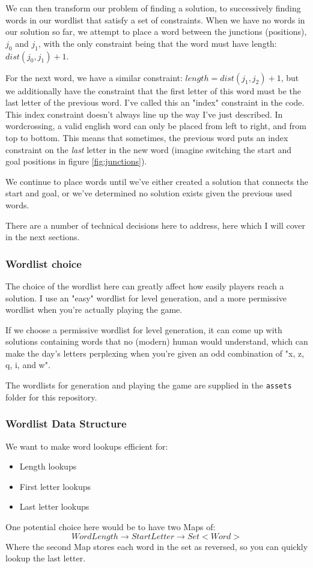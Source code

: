 \documentclass{article}
\begin{document}
We can then transform our problem of finding a solution, to successively finding
words in our wordlist that satisfy a set of constraints. 
When we have no words in our solution so far, we attempt 
to place a word between the junctions (positions), $j_0$ and $j_1$, with the
only constraint being that the word must have length: $dist(j_0, j_1) + 1$.

For the next word, we have a similar constraint: $length = dist(j_1, j_2) + 1$, 
but we additionally have the constraint that the first letter of this word must 
be the last letter of the previous word. I've called this an "index" constraint in the 
code. This index constraint doesn't always line up the way I've just described.
In wordcrossing, a valid english word can only be placed from left to right,
and from top to bottom. This means that sometimes, the previous word puts an index 
constraint on the \emph{last} letter in the new word 
(imagine switching the start and goal positions in figure \ref{fig:junctions}).

We continue to place words until we've either created a solution that connects the 
start and goal, or we've determined no solution exists given the previous used words. 

There are a number of technical decisions here to address, here which I will
cover in the next sections.

\subsubsection{Wordlist choice}
The choice of the wordlist here can greatly affect how easily players reach a solution.
I use an "easy" wordlist for level generation, and a more permissive wordlist when
you're actually playing the game.

If we choose a permissive wordlist for level generation, it can come up with solutions 
containing words that no (modern) human would understand, which can make the day's 
letters perplexing when you're given an odd combination of "x, z, q, i, and w".

The wordlists for generation and playing the game are supplied in the \texttt{assets}
folder for this repository.

\subsubsection{Wordlist Data Structure}
We want to make word lookups efficient for:
\begin{itemize}
  \item Length lookups
  \item First letter lookups
  \item Last letter lookups
\end{itemize}
One potential choice here would be to have two Maps of:
\begin{displaymath}
  WordLength \rightarrow StartLetter \rightarrow Set<Word>
\end{displaymath}
Where the second Map stores each word in the set as reversed, so
you can quickly lookup the last letter.
\end{document}
